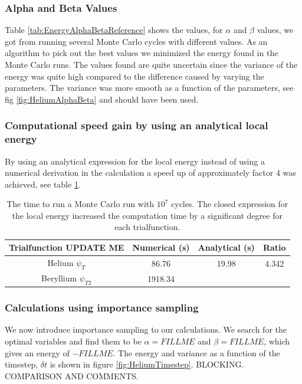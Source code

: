 		\subsubsection{Alpha and Beta Values}

			Table \ref{tab:EnergyAlphaBetaReference} shows the values, for \(\alpha\) and \(\beta\) values, we got from  running several Monte Carlo cycles with different values. As an algorithm to pick out the best values we minimized the energy found in the Monte Carlo runs. The values found are quite uncertain since the variance of the energy was quite high compared to the difference caused by varying the parameters. The variance was more smooth as a function of the parameters, see fig \ref{fig:HeliumAlphaBeta} and should have been used.




		\subsubsection{Computational speed gain by using an analytical local energy}
			By using an analytical expression for the local energy instead of using a numerical derivation in the calculation a speed up of approximately factor \(4\) was achieved, see table \ref{tab:analyticVSNumeric}.

			\begin{table}
				\center
				\begin{tabular}{| c | c | c | c |}
				    \hline
				   	\textbf{Trialfunction UPDATE ME} & Numerical (s) & Analytical (s) & Ratio
				    \\ \hline
				    Helium $\psi_{T}$ & 86.76 & 19.98	& 4.342
				    \\	\hline
				    Beryllium $\psi_{T2}$ & 1918.34  &	 &
					    \\ \hline
				\end{tabular}
				\caption{The time to run a Monte Carlo run with \(10^7\) cycles. The closed expression for the local energy increased the computation time by a significant degree for each trialfunction. }
				\label{tab:analyticVSNumeric}
			\end{table}

		\subsubsection{Calculations using importance sampling}
			We now introduce importance sampling to our calculations. We search for the optimal variables and find them to be $\alpha=FILLME$ and $\beta=FILLME$, which gives an energy of $-FILLME$. The energy and variance as a function of the timestep, $\delta t$ is shown in figure \ref{fig:HeliumTimestep}. BLOCKING. COMPARISON AND COMMENTS. 

